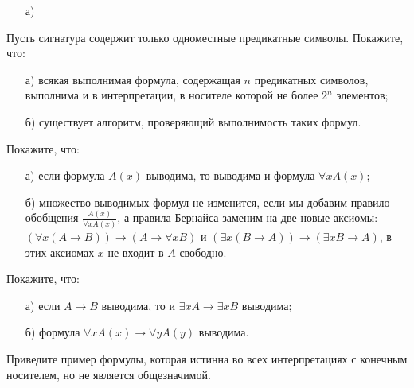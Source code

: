 
    \begin{enumerate}[topsep = 0pt, itemsep = -1ex]
        \item [а)]
    \end{enumerate}

\begin{task}
	Пусть сигнатура содержит только одноместные предикатные символы. Покажите, что:
    \begin{enumerate}[topsep = 0pt, itemsep = -1ex]
        \item [а)] всякая выполнимая формула, содержащая $n$ предикатных символов, выполнима и в интерпретации, в носителе которой
    		не более $2^n$ элементов;
        \item [б)] существует алгоритм, проверяющий выполнимость таких формул.
    \end{enumerate}
\end{task}


\begin{task}
    Покажите, что:
    \begin{enumerate}[topsep = 0pt, itemsep = -1ex]
        \item [а)] если формула $A(x)$ выводима, то выводима и формула $\forall x A(x)$;
        \item [б)] множество выводимых формул не изменится, если мы добавим правило обобщения $\frac{A(x)}{\forall x A(x)}$, а
    		правила Бернайса заменим на две новые аксиомы:\\ $(\forall x (A \to B)) \to (A \to \forall x B)$ и
			$(\exists x (B \to A)) \to (\exists x B \to A)$, в этих аксиомах $x$ не входит в $A$ свободно.
    \end{enumerate}
\end{task}

\begin{task}
    Покажите, что:
    \begin{enumerate}[topsep = 0pt, itemsep = -1ex]
        \item [а)] если $A \to B$ выводима, то и $\exists x A \to \exists x B$ выводима;
        \item [б)] формула $\forall x A(x)\to \forall y A(y)$ выводима.
    \end{enumerate}
\end{task}


\begin{task}
	Приведите пример формулы, которая истинна во всех интерпретациях с конечным носителем, но не является общезначимой.
\end{task}


